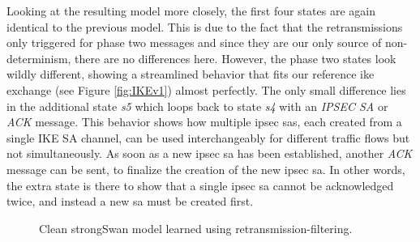 Looking at the resulting model more closely, the first four states are again identical to the previous model. This is due to the fact that the retransmissions only triggered for phase two messages and since they are our only source of non-determinism, there are no differences here. However, the phase two states look wildly different, showing a streamlined behavior that fits our reference \ac{ike} exchange (see Figure \ref{fig:IKEv1}) almost perfectly. The only small difference lies in the additional state \emph{s5} which loops back to state \emph{s4} with an \emph{IPSEC SA} or \emph{ACK} message. This behavior shows how multiple \ac{ipsec} \acp{sa}, each created from a single IKE SA channel, can be used interchangeably for different traffic flows but not simultaneously. As soon as a new \ac{ipsec} \ac{sa} has been established, another \emph{ACK} message can be sent, to finalize the creation of the new \ac{ipsec} \ac{sa}. In other words, the extra state is there to show that a single \ac{ipsec} \ac{sa} cannot be acknowledged twice, and instead a new \ac{sa} must be created first. 

\begin{figure}[ht]
	\vspace*{\fill}
	\noindent
	\hspace*{-5.5\oddsidemargin}%
	\caption{Clean strongSwan model learned using retransmission-filtering.}
	\label{fig:reference}
	\vspace*{\fill}
\end{figure}

